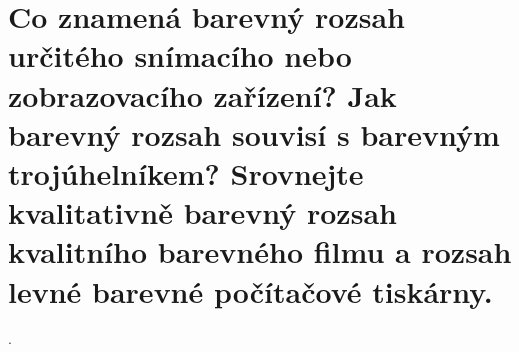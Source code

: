 \section{Co znamená barevný rozsah určitého snímacího nebo zobrazovacího zařízení? Jak barevný rozsah souvisí s barevným 
trojúhelníkem? Srovnejte kvalitativně barevný rozsah kvalitního barevného filmu a rozsah levné barevné počítačové 
tiskárny.}.